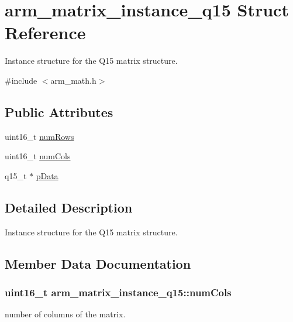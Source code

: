 \hypertarget{structarm__matrix__instance__q15}{}\section{arm\+\_\+matrix\+\_\+instance\+\_\+q15 Struct Reference}
\label{structarm__matrix__instance__q15}


Instance structure for the Q15 matrix structure.  




{\ttfamily \#include $<$arm\+\_\+math.\+h$>$}

\subsection*{Public Attributes}
\begin{DoxyCompactItemize}
\item 
uint16\+\_\+t \hyperlink{structarm__matrix__instance__q15_a9bac6ed54be287c4d4f01a1a28be65f5}{num\+Rows}
\item 
uint16\+\_\+t \hyperlink{structarm__matrix__instance__q15_acbbce67ba058d8e1c867c71d57288c97}{num\+Cols}
\item 
q15\+\_\+t $\ast$ \hyperlink{structarm__matrix__instance__q15_a6da33a5553e634787d0f515cf8d724af}{p\+Data}
\end{DoxyCompactItemize}


\subsection{Detailed Description}
Instance structure for the Q15 matrix structure. 

\subsection{Member Data Documentation}
\subsubsection[{\texorpdfstring{num\+Cols}{numCols}}]{\setlength{\rightskip}{0pt plus 5cm}uint16\+\_\+t arm\+\_\+matrix\+\_\+instance\+\_\+q15\+::num\+Cols}\hypertarget{structarm__matrix__instance__q15_acbbce67ba058d8e1c867c71d57288c97}{}\label{structarm__matrix__instance__q15_acbbce67ba058d8e1c867c71d57288c97}
number of columns of the matrix. 
